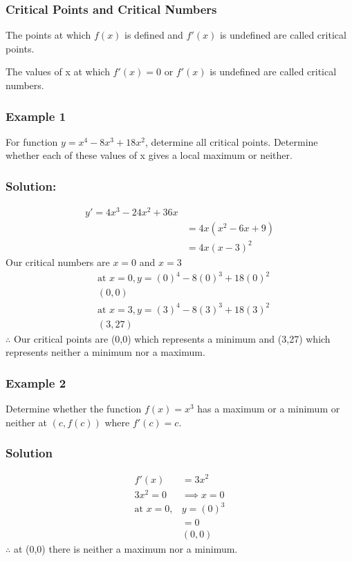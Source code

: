 \documentclass{article}
\begin{document}
\subsubsection{Critical Points and Critical Numbers}
The points at which $f(x)$ is defined and $f'(x)$ is undefined are called critical points.

The values of x at which $f'(x)=0$ or $f'(x)$ is undefined are called critical numbers.

\subsubsection{Example 1}
For function $y=x^4-8x^3+18x^2$, determine all critical points. Determine whether each of these values of x gives a local maximum or neither.
\subsubsection*{Solution:}
\begin{align*}
    y'=4x^3-24x^2+36x\\
    &=4x(x^2-6x+9)\\
    &=4x(x-3)^2
\end{align*}
Our critical numbers are $x=0$ and $x=3$\\
\begin{align*}
    &\text{at } x=0, y=(0)^4-8(0)^3+18(0)^2\\
    &(0,0)\\
    &\text{at } x=3, y=(3)^4-8(3)^3+18(3)^2\\
    &(3,27)
\end{align*}
$\therefore$ Our critical points are (0,0) which represents a minimum and (3,27) which represents neither a minimum nor a maximum.
\subsubsection{Example 2}
Determine whether the function $f(x)=x^3$ has a maximum or a minimum or neither at $(c, f(c))$ where $f'(c)=c.$
\subsubsection*{Solution}
\begin{align*}
    f'(x)&=3x^2\\
    3x^2=0 &\implies x=0\\
    \text{at } x=0,& y=(0)^3\\
    &=0\\
    &(0,0)
\end{align*}
$\therefore$ at (0,0) there is neither a maximum nor a minimum.
\end{document}

